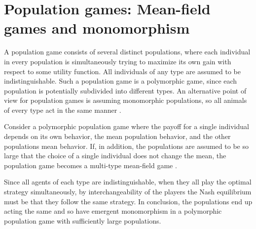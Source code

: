 
\section{Population games: Mean-field games and monomorphism}


A population game consists of several distinct populations, where each individual in every population is simultaneously trying to maximize its own gain with respect to some utility function. All individuals of any type are assumed to be indistinguishable. Such a population game is a polymorphic game, since each population is potentially subdivided into different types. An alternative point of view for population games is assuming monomorphic populations, so all animals of every type act in the same manner \citep{vincent2005evolutionary}.

Consider a polymorphic population game where the payoff for a single individual depends on its own behavior, the mean population behavior, and the other populations mean behavior. If, in addition, the populations are assumed to be so large that the choice of a single individual does not change the mean, the population game becomes a multi-type mean-field game \citep{blanchet2016optimal}.

Since all agents of each type are indistinguishable, when they all play the optimal strategy simultaneously, by interchangeability of the players the Nash equilibrium must be that they follow the same strategy. In conclusion, the populations end up acting the same and so have emergent monomorphism in a polymorphic population game with sufficiently large populations.

